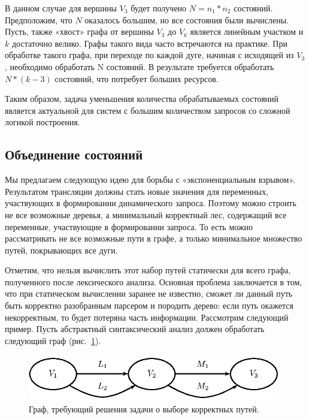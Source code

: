 \documentclass{llncs}
\begin{document}
В данном случае для вершины $V_3$ будет получено $N = n_1*n_2$ состояний. Предположим, что $N$ оказалось большим, но все состояния были вычислены. Пусть, также «хвост» графа от вершины $V_3$ до $V_k$ является линейным участком и $k$ достаточно велико. Графы такого вида часто встречаются на практике. При обработке такого графа, при переходе по каждой дуге, начиная с исходящей из $V_3$, необходимо обработать N состояний. В результате требуется обработать $N*(k-3)$ состояний, что потребует больших ресурсов.

Таким образом, задача уменьшения количества обрабатываемых состояний является  актуальной для систем с большим количеством запросов со сложной логикой построения.

\subsection{Объединение состояний}

Мы предлагаем следующую идею для борьбы с «экспоненциальным взрывом». Результатом трансляции должны стать новые значения для переменных, участвующих в формировании динамического запроса. Поэтому можно строить не все возможные деревья, а минимальный корректный лес, содержащий все переменные, участвующие в формировании запроса. То есть можно рассматривать не все возможные пути в графе, а только минимальное множество путей, покрывающих все дуги.

Отметим, что нельзя вычислить этот набор путей статически для всего графа, полученного после лексического анализа. Основная проблема заключается в том, что при статическом вычислении заранее не известно, сможет ли данный путь быть корректно разобранным парсером и породить дерево: если путь окажется некорректным, то будет потеряна часть информации.
Рассмотрим следующий пример. Пусть абстрактный синтаксический анализ должен обработать следующий граф (рис.~\ref{pic6}).


\begin{figure}
    \begin{center}
        \includegraphics[width=11cm,height=2cm]{graphs/paths.eps}
        \caption{Граф, требующий решения задачи о выборе корректных путей.}
        \label{pic6}
    \end{center}
\end{figure}
\end{document}

